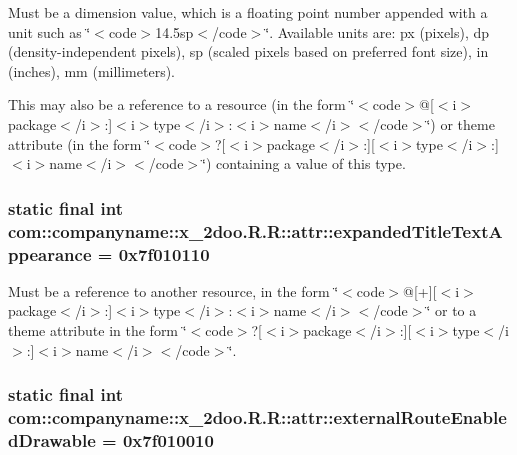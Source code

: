 Must be a dimension value, which is a floating point number appended with a unit such as \char`\"{}$<$code$>$14.5sp$<$/code$>$\char`\"{}. Available units are: px (pixels), dp (density-independent pixels), sp (scaled pixels based on preferred font size), in (inches), mm (millimeters). 

This may also be a reference to a resource (in the form \char`\"{}$<$code$>$@\mbox{[}$<$i$>$package$<$/i$>$:\mbox{]}$<$i$>$type$<$/i$>$:$<$i$>$name$<$/i$>$$<$/code$>$\char`\"{}) or theme attribute (in the form \char`\"{}$<$code$>$?\mbox{[}$<$i$>$package$<$/i$>$:\mbox{]}\mbox{[}$<$i$>$type$<$/i$>$:\mbox{]}$<$i$>$name$<$/i$>$$<$/code$>$\char`\"{}) containing a value of this type. \hypertarget{classcom_1_1companyname_1_1x__2doo_1_1_r_1_1attr_393be22751f73306c5ee586d2ab117dd}{
\subsubsection[{expandedTitleTextAppearance}]{\setlength{\rightskip}{0pt plus 5cm}static final int com::companyname::x\_\-2doo.R.R::attr::expandedTitleTextAppearance = 0x7f010110}}
\label{classcom_1_1companyname_1_1x__2doo_1_1_r_1_1attr_393be22751f73306c5ee586d2ab117dd}


Must be a reference to another resource, in the form \char`\"{}$<$code$>$@\mbox{[}+\mbox{]}\mbox{[}$<$i$>$package$<$/i$>$:\mbox{]}$<$i$>$type$<$/i$>$:$<$i$>$name$<$/i$>$$<$/code$>$\char`\"{} or to a theme attribute in the form \char`\"{}$<$code$>$?\mbox{[}$<$i$>$package$<$/i$>$:\mbox{]}\mbox{[}$<$i$>$type$<$/i$>$:\mbox{]}$<$i$>$name$<$/i$>$$<$/code$>$\char`\"{}. \hypertarget{classcom_1_1companyname_1_1x__2doo_1_1_r_1_1attr_bc0fec80fdda096106acf7021ae96da7}{
\subsubsection[{externalRouteEnabledDrawable}]{\setlength{\rightskip}{0pt plus 5cm}static final int com::companyname::x\_\-2doo.R.R::attr::externalRouteEnabledDrawable = 0x7f010010}}
\label{classcom_1_1companyname_1_1x__2doo_1_1_r_1_1attr_bc0fec80fdda096106acf7021ae96da7}


